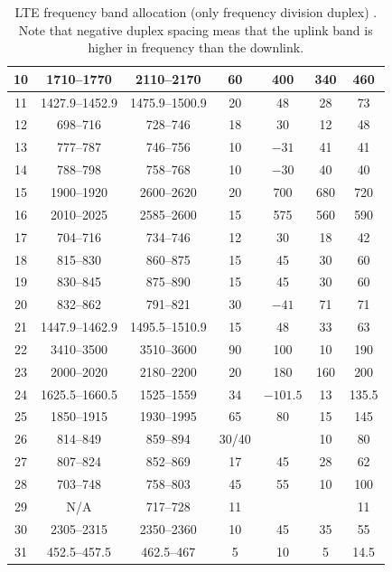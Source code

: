\begin{table}[htbp]
\begin{tabular}{|c|c|c|c|c|c|c|}
    10 & 1710--1770 & 2110--2170 & 60 & 400  & 340  & 460\\ \hline
    11 & 1427.9--1452.9 & 1475.9--1500.9 & 20 & 48  & 28  & 73\\ \hline
    12 & 698--716   & 728--746   & 18 & 30  & 12  & 48\\ \hline
    13 & 777--787   & 746--756   & 10 & $-31$  & 41  & 41\\ \hline
    14 & 788--798   & 758--768   & 10 & $-30$  & 40  & 40\\ \hline
    15 & 1900--1920 & 2600--2620 & 20 & 700  & 680  & 720\\ \hline
    16 & 2010--2025 & 2585--2600 & 15 & 575 & 560 & 590\\ \hline
    17 & 704--716   & 734--746   & 12 & 30  & 18  & 42\\ \hline
    18 & 815--830   & 860--875   & 15 & 45  & 30  & 60\\ \hline
    19 & 830--845   & 875--890   & 15 & 45  & 30  & 60\\ \hline
    20 & 832--862   & 791--821   & 30 & $-41$  & 71  & 71\\ \hline
    21 & 1447.9--1462.9 & 1495.5--1510.9 & 15 & 48  & 33  & 63\\ \hline
    22 & 3410--3500 & 3510--3600 & 90 & 100  & 10  & 190\\ \hline
    23 & 2000--2020 & 2180--2200 & 20 & 180  & 160  & 200\\ \hline
    24 & 1625.5--1660.5 & 1525--1559 & 34 & $-101.5$  & 13  & 135.5\\ \hline
    25 & 1850--1915 & 1930--1995 & 65 & 80  & 15  & 145\\ \hline
    26 & 814--849   & 859--894   & 30/40 &     & 10  & 80\\ \hline
    27 & 807--824   & 852--869   & 17 & 45  & 28  & 62\\ \hline
    28 & 703--748   & 758--803   & 45 & 55  & 10  & 100\\ \hline
    29 & N/A         & 717--728   & 11 &     &     & 11\\ \hline
    30 & 2305--2315 & 2350--2360 & 10 & 45  & 35  & 55\\ \hline
    31 & 452.5--457.5 & 462.5--467 & 5  & 10  & 5   & 14.5\\ \hline
  \end{tabular}
  \caption{LTE frequency band allocation (only frequency division duplex) \cite{radio2015electronics}. Note that negative duplex spacing meas that the uplink band is higher in frequency than the downlink.}
  \label{tab:ltefreqband}
\end{table}

